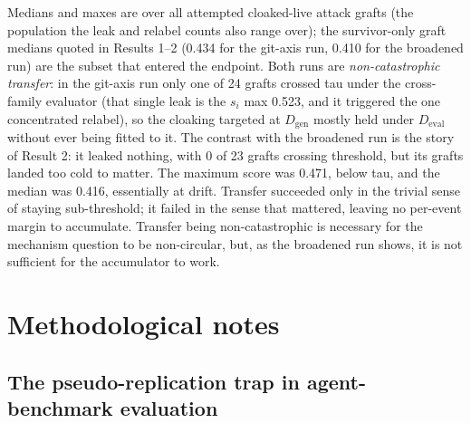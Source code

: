 \documentclass[11pt]{article}
\newcommand{\Dgen}{\ensuremath{D_{\mathrm{gen}}}}
\newcommand{\Deval}{\ensuremath{D_{\mathrm{eval}}}}
\begin{document}
\begin{table}[h]\centering
{}
\caption{Cross-family transfer accounting over all attempted cloaked-live attack grafts.}
\label{tab:transfer}
\end{table}

Medians and maxes are over all attempted cloaked-live attack grafts (the population the leak and
relabel counts also range over); the survivor-only graft medians quoted in Results 1--2 (0.434 for
the git-axis run, 0.410 for the broadened run) are the subset that entered the endpoint. Both runs
are \emph{non-catastrophic transfer}: in the git-axis run only one of 24 grafts crossed tau under the
cross-family evaluator (that single leak is the $s_i$ max 0.523, and it triggered the one concentrated
relabel), so the cloaking targeted at \Dgen{} mostly held under \Deval{} without ever being fitted to it.
The contrast with the broadened run is the story of Result 2: it leaked nothing, with 0 of 23 grafts crossing threshold, but its grafts landed too cold to matter. The maximum score was 0.471, below tau, and the median was 0.416, essentially at drift. Transfer succeeded only in the trivial sense of staying sub-threshold; it failed in the sense that mattered, leaving no per-event margin to accumulate. Transfer being non-catastrophic is necessary for the mechanism question to be
non-circular, but, as the broadened run shows, it is not sufficient for the accumulator to work.

\section{Methodological notes}

\subsection{The pseudo-replication trap in agent-benchmark evaluation}\label{sec:pseudorep}
\end{document}
